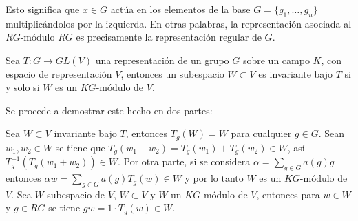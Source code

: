   Esto significa que $x \in G$ actúa en los elementos de la base $G = \{ g_1, \dots, g_n \}$ multiplicándolos por la izquierda. En otras palabras, la representación asociada al $RG\mbox{-módulo}$ $RG$ es precisamente la representación regular de $G$. 
\begin{lema}
  Sea $T \colon G \to GL(V)$ una representación de un grupo $G$ sobre un campo $K$, con espacio de representación $V$, entonces un subespacio $W \subset V$ es invariante bajo $T$ si y solo si $W$ es un $KG\mbox{-módulo}$ de $V$. 
  \end{lema}
  \begin{proof*}
  Se procede a demostrar este hecho en dos partes:
  \begin{bulletList}
  \newItem Sea $W \subset V$ invariante bajo $T$, entonces $T_{g}(W) = W$ para cualquier $g \in G$. Sean $w_1, w_2 \in W$ se tiene que $T_{g}(w_1 + w_2) = T_{g}(w_1) + T_{g}(w_2) \in W$, así $T_{g}^{-1}(T_{g}(w_1 + w_2)) \in W$. Por otra parte, si se considera $\alpha = \sum_{g \in G}a(g)g$ entonces $\alpha w = \sum_{g \in G}a(g)T_g(w) \in W$ y por lo tanto $W$ es un $KG\mbox{-módulo}$ de~$V$.
  \newItem Sea $W$ subespacio de $V$, $W \subset V$ y $W$ un $KG\mbox{-módulo}$ de $V$, entonces para $w \in W$ y $g \in RG$ se tiene $gw = 1\cdot T_g(w) \in W$. \qedhere
  \end{bulletList} 
  \end{proof*}
  
